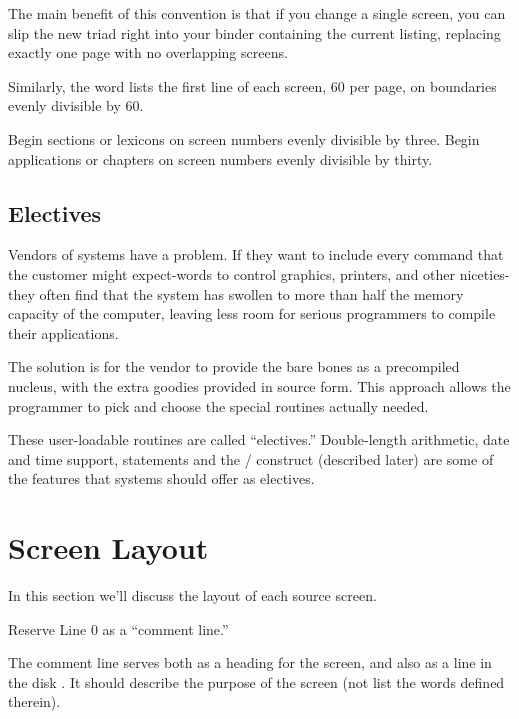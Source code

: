 The main benefit of this convention is that if you change a single
screen, you can slip the new triad right into your binder containing
the current listing, replacing exactly one page with no overlapping
screens.

Similarly, the word  lists the first line of each screen,
60 per page, on boundaries evenly divisible by 60.

\begin{tip}
Begin sections or lexicons on screen numbers evenly divisible by three.
Begin applications or chapters on screen numbers evenly divisible by
thirty.
\end{tip}

\subsection{Electives}
Vendors of \Forth{} systems have a problem.  If they want to include
every command that the customer might expect-words to control
graphics, printers, and other niceties-they often find that the system
has swollen to more than half the memory capacity of the computer,
leaving less room for serious programmers to compile their
applications.

The solution is for the vendor to provide the bare bones as a
precompiled nucleus, with the extra goodies provided in source form.
This approach allows the programmer to pick and choose the special
routines actually needed.

These user-loadable routines are called ``electives.'' Double-length
arithmetic, date and time support,  statements and the
/\hy {} construct (described later) are some of
the features that \Forth{} systems should offer as electives.

\section{Screen Layout}

In this section we'll discuss the layout of each source screen.

\begin{tip}
Reserve Line 0 as a ``comment line.''
\end{tip}
The comment line serves both as a heading for the screen, and also as
a line in the disk .  It should describe the purpose of
the screen (not list the words defined therein).

